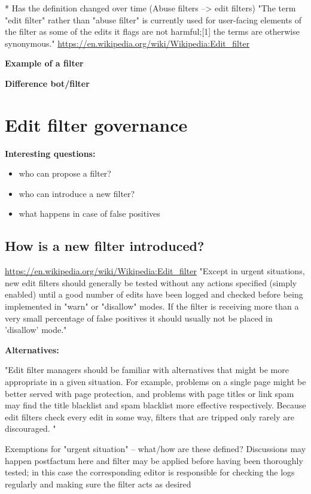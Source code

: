 \documentclass{sigchi}
\begin{document}
* Has the definition changed over time (Abuse filters --> edit filters)
"The term "edit filter" rather than "abuse filter" is currently used for user-facing elements of the filter as some of the edits it flags are not harmful;[1] the terms are otherwise synonymous."
\url{https://en.wikipedia.org/wiki/Wikipedia:Edit_filter}

\textbf{Example of a filter}

\textbf{Difference bot/filter}

\section{Edit filter governance}

\textbf{Interesting questions:}

\begin{itemize}
    \item who can propose a filter?
    \item who can introduce a new filter?
    \item what happens in case of false positives
\end{itemize}

\subsection{How is a new filter introduced?}
\url{https://en.wikipedia.org/wiki/Wikipedia:Edit_filter}
"Except in urgent situations, new edit filters should generally be tested without any actions specified (simply enabled) until a good number of edits have been logged and checked before being implemented in "warn" or "disallow" modes. If the filter is receiving more than a very small percentage of false positives it should usually not be placed in 'disallow' mode."

\textbf{Alternatives:}

"Edit filter managers should be familiar with alternatives that might be more appropriate in a given situation. For example, problems on a single page might be better served with page protection, and problems with page titles or link spam may find the title blacklist and spam blacklist more effective respectively. Because edit filters check every edit in some way, filters that are tripped only rarely are discouraged. "

Exemptions for "urgent situation" -- what/how are these defined?
Discussions may happen postfactum here and filter may be applied before having been thoroughly tested; in this case the corresponding editor is responsible for checking the logs regularly and making sure the filter acts as desired
\end{document}
